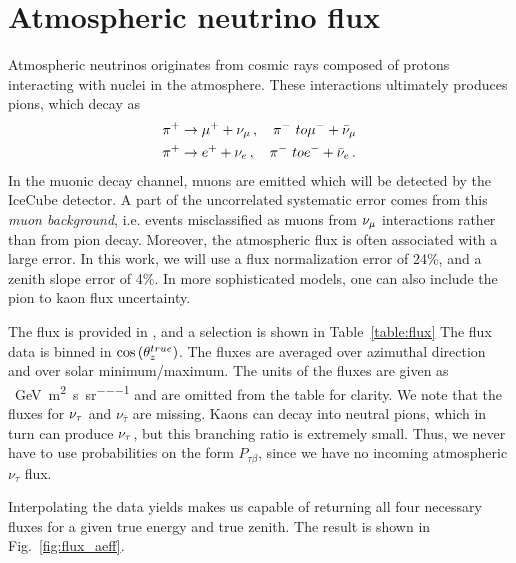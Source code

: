\documentclass{thesis}
\begin{document}
\section{Atmospheric neutrino flux}
Atmospheric neutrinos originates from cosmic rays composed of protons interacting with nuclei in the atmosphere.
These interactions ultimately produces pions, which decay as 
\begin{align}\label{eq:pion}
    \pi^+ &\to \mu^+ + \nu_\mu\,, \quad \pi^- \ to \mu^- + \bar{\nu}_\mu \nonumber \\
    \pi^+ &\to e^+ + \nu_e\,, \quad \pi^- \ to e^- + \bar{\nu}_e\,.
\end{align}
In the muonic decay channel, muons are emitted which will be detected by the IceCube detector. A part of the 
uncorrelated systematic error comes from this \emph{muon background}, i.e. events misclassified as muons from 
$\nu_\mu$ interactions rather than from pion decay. Moreover, the atmospheric flux is often associated with a large error.
In this work, we will use a flux normalization error of 24\%, and a zenith slope error of 4\%. In more sophisticated 
models, one can also include the pion to kaon flux uncertainty.

The flux is provided in \cite{hondaData,hondaArticle}, and a selection is shown in Table~\ref{table:flux}
The flux data is binned in $\cos{(\theta_z^{true})}$. The fluxes are averaged over azimuthal direction and over solar minimum/maximum. 
The units of the fluxes are given as \si{\per\GeV \per\metre\squared \per\second \per\steradian} and are omitted
from the table for clarity. 
We note that the fluxes for $\nu_\tau$ and $\nu_{\bar{\tau}}$ are missing. Kaons can decay into neutral pions, which in turn 
can produce $\nu_\tau$, but this branching ratio is extremely small. Thus, we never have to use probabilities on the form 
$P_{\tau \beta}$, since we have no incoming atmospheric $\nu_\tau$ flux. 

Interpolating the data yields makes us capable of returning all four necessary fluxes for a given true energy and true zenith.
The result is shown in Fig.~\ref{fig:flux_aeff}.
\end{document}
